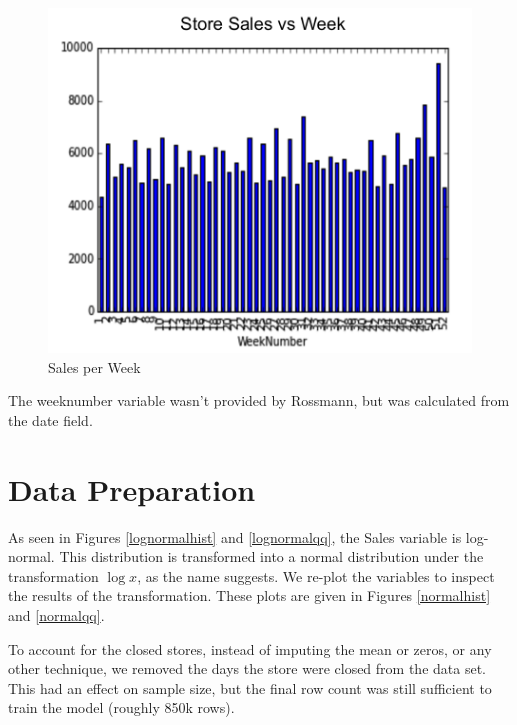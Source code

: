 \documentclass[DIV=calc, paper=a4, fontsize=11pt]{scrartcl}	 %
\begin{document}
\begin{figure}[!htbp]
\centering
\caption{Sales per Week}
\label{seasonality}
\includegraphics[scale=0.65]{figures/seasonality.png}
\end{figure} 

The weeknumber variable wasn't provided by Rossmann, but was calculated from the date field.


\section*{Data Preparation}

As seen in Figures \ref{lognormalhist} and \ref{lognormalqq}, the Sales variable is log-normal. This distribution is transformed into a normal distribution under the transformation $\log{x}$, as the name suggests. We re-plot the variables to inspect the results of the transformation. These plots are given in Figures \ref{normalhist} and \ref{normalqq}. 

To account for the closed stores, instead of imputing the mean or zeros, or any other technique, we removed the days the store were closed from the data set. This had an effect on sample size, but the final row count was still sufficient to train the model (roughly 850k rows).
\end{document}
